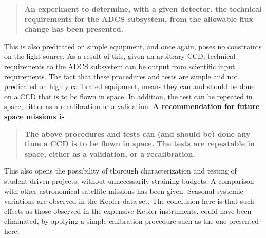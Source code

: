 \documentclass[../main.tex]{subfiles}
\begin{document}
\begin{tcolorbox}[colframe = white, sharpish corners]
	\begin{quote}
		\textbf{An experiment to determine, with a given detector, the technical requirements for the ADCS subsystem, from the allowable flux change has been presented.}
	\end{quote} 
\end{tcolorbox}

\noindent This is also predicated on simple equipment, and once again, poses no constraints on the light source. As a result of this, given an arbitrary CCD, technical requirements to the ADCS subsystem can be output from scientific input requirements. The fact that these procedures and tests are simple and not predicated on highly calibrated equipment, means they can and should be done on a CCD that is to be flown in space. In addition, the test can be repeated in space, either as a recalibration or a validation.  \textbf{A recommendation for future space missions is}

\begin{tcolorbox}[colframe = white, sharpish corners]
	\begin{quote}
		\textbf{The above procedures and tests can (and should be) done any time a CCD is to be flown in space. The tests are repeatable in space, either as a validation, or a recalibration. }
	\end{quote} 
\end{tcolorbox}

\noindent This also opens the possibility of thorough characterization and testing of student-driven projects, without unnecessarily straining budgets. A comparison with other astronomical satellite missions has been given. Seasonal systemic variations are observed in the Kepler data set. The conclusion here is that such effects as those observed in the expensive Kepler instruments, could have been eliminated, by applying a simple calibration procedure such as the one presented here.
	
	
\end{document}
